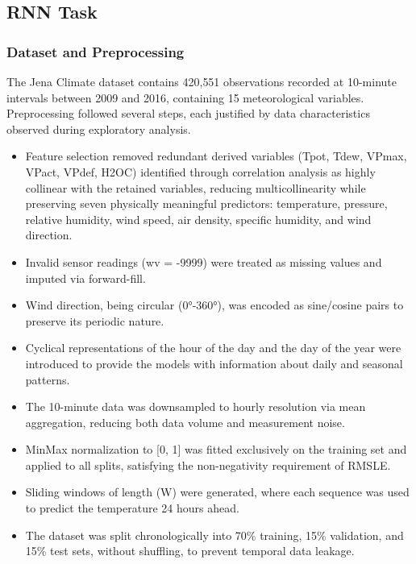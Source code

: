 \documentclass[conference]{IEEEtran}
\begin{document}
\subsection{RNN Task}

\subsubsection{Dataset and Preprocessing} The Jena Climate dataset contains 420,551 observations recorded at 10-minute intervals between 2009 and 2016, containing 15 meteorological variables. Preprocessing followed several steps, each justified by data characteristics observed during exploratory analysis.

\begin{itemize}
\item Feature selection removed redundant derived variables (Tpot, Tdew, VPmax, VPact, VPdef, H2OC) identified through correlation analysis as highly collinear with the retained variables, reducing multicollinearity while preserving seven physically meaningful predictors: temperature, pressure, relative humidity, wind speed, air density, specific humidity, and wind direction.

\item Invalid sensor readings (wv = -9999) were treated as missing values and imputed via forward-fill.

\item Wind direction, being circular (0°-360°), was encoded as sine/cosine pairs to preserve its periodic nature. 

\item Cyclical representations of the hour of the day and the day of the year were introduced to provide the models with information about daily and seasonal patterns.

\item The 10-minute data was downsampled to hourly resolution via mean aggregation, reducing both data volume and measurement noise.

\item MinMax normalization to [0, 1] was fitted exclusively on the training set and applied to all splits, satisfying the non-negativity requirement of RMSLE.

\item Sliding windows of length (W) were generated, where each sequence was used to predict the temperature 24 hours ahead.

\item The dataset was split chronologically into 70\% training, 15\% validation, and 15\% test sets, without shuffling, to prevent temporal data leakage.


\end{itemize}
\end{document}
